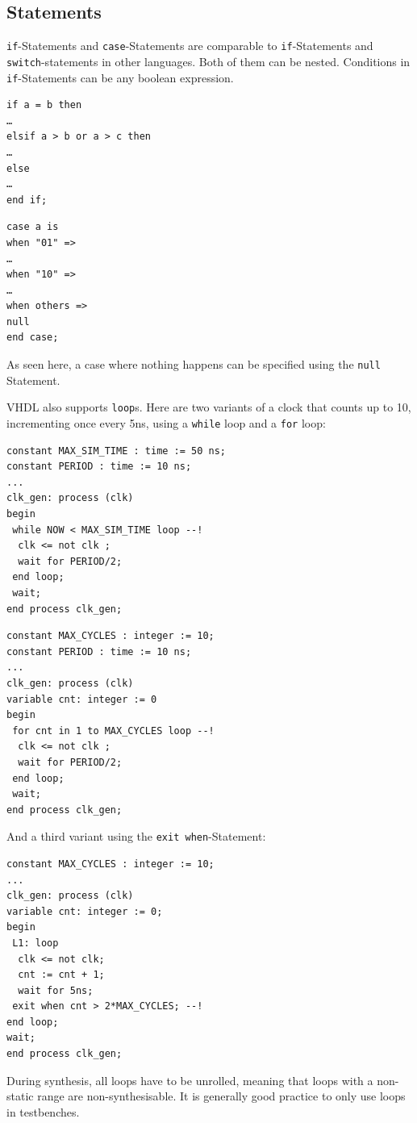 \documentclass{report}
\newcommand*{\newpar}{\par\vspace{\baselineskip}\noindent} %
\begin{document}
\subsection{Statements}
\texttt{if}-Statements and \texttt{case}-Statements are comparable to \texttt{if}-Statements and \texttt{switch}-statements in other languages. Both of them can be nested. Conditions in \texttt{if}-Statements can be any boolean expression.
\begin{multicols}{2}
\begin{verbatim}
if a = b then
…
elsif a > b or a > c then
…
else
…
end if;    
\end{verbatim}
\begin{verbatim}
case a is
when "01" =>
…
when "10" =>
…
when others =>
null
end case;    
\end{verbatim}
\end{multicols}
\newpar
As seen here, a case where nothing happens can be specified using the \texttt{null} Statement.
\newpar
VHDL also supports \texttt{loop}s. Here are two variants of a clock that counts up to 10, incrementing once every 5ns, using a \texttt{while} loop and a \texttt{for} loop:
\begin{multicols}{2}
\begin{verbatim}
constant MAX_SIM_TIME : time := 50 ns;
constant PERIOD : time := 10 ns;
...
clk_gen: process (clk)
begin
 while NOW < MAX_SIM_TIME loop --!
  clk <= not clk ;
  wait for PERIOD/2;
 end loop;
 wait;
end process clk_gen;
\end{verbatim}
\begin{verbatim}
constant MAX_CYCLES : integer := 10;
constant PERIOD : time := 10 ns;
...
clk_gen: process (clk)
variable cnt: integer := 0
begin
 for cnt in 1 to MAX_CYCLES loop --!
  clk <= not clk ;
  wait for PERIOD/2;
 end loop;
 wait;
end process clk_gen;
\end{verbatim}
\end{multicols}
\newpar
And a third variant using the \texttt{exit when}-Statement:
\begin{verbatim}
constant MAX_CYCLES : integer := 10;
...
clk_gen: process (clk)
variable cnt: integer := 0;
begin
 L1: loop
  clk <= not clk;
  cnt := cnt + 1;
  wait for 5ns;
 exit when cnt > 2*MAX_CYCLES; --!
end loop;
wait;
end process clk_gen;
\end{verbatim}
\newpar
During synthesis, all loops have to be unrolled, meaning that loops with a non-static range are non-synthesisable. It is generally good practice to only use loops in testbenches.
\end{document}
